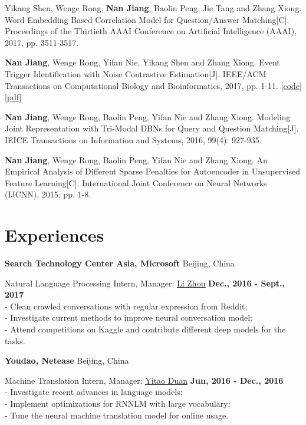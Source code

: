 \documentclass[margin,line]{resume}
\begin{document}
\begin{resume}
Yikang Shen, Wenge Rong, \textbf{Nan Jiang}, Baolin Peng, Jie Tang and Zhang Xiong. Word Embedding Based Correlation Model for Question/Answer Matching[C]. Proceedings of the Thirtieth {AAAI} Conference on Artificial Intelligence (AAAI), 2017, pp. 3511-3517.

\textbf{Nan Jiang}, Wenge Rong, Yifan Nie, Yikang Shen and Zhang Xiong. Event Trigger Identification with Noise Contrastive Estimation[J]. IEEE/ACM Transactions on Computational Biology and Bioinformatics, 2017, pp. 1-11. [\href{https://github.com/jiangnanHugo/mlee-nce}{code}][\href{https://github.com/jiangnanhugo/paper/blob/master/APBC2017/APBC2017.pdf}{pdf}]

\textbf{Nan Jiang}, Wenge Rong, Baolin Peng, Yifan Nie and Zhang Xiong. Modeling Joint Representation with Tri-Modal DBNs for Query and Question Matching[J]. IEICE Transactions on Information and Systems, 2016, 99(4): 927-935.

\textbf{Nan Jiang}, Wenge Rong, Baolin Peng, Yifan Nie and Zhang Xiong. An Empirical Analysis of Different Sparse Penalties
for Autoencoder in Unsupervised Feature Learning[C]. International Joint Conference on Neural Networks (IJCNN), 2015, pp. 1-8.




\section{Experiences}
{\bf Search Technology Center Asia, Microsoft} \hfill { Beijing, China}

{ Natural Language Processing Intern, Manager: \underline{\href{http://dblp.uni-trier.de/pers/hd/z/Zhou:Li}{Li Zhou}}} \hfill {\bf Dec., 2016 - Sept., 2017}\\
- Clean crawled conversations with regular expression from Reddit;\\
- Investigate current methods to improve neural conversation model;\\
- Attend competitions on Kaggle and contribute different deep models for the tasks.




{\bf Youdao, Netease}  \hfill { Beijing, China}

{ Machine Translation Intern, Manager: \underline{\href{http://dblp.uni-trier.de/pers/hd/d/Duan:Yitao}{Yitao Duan}}} \hfill {\bf Jun, 2016 - Dec., 2016}\\
- Investigate recent advances in language models; \\
- Implement optimizations for RNNLM with large vocabulary; \\
- Tune the neural machine translation model for online usage.



\end{resume}
\end{document}
